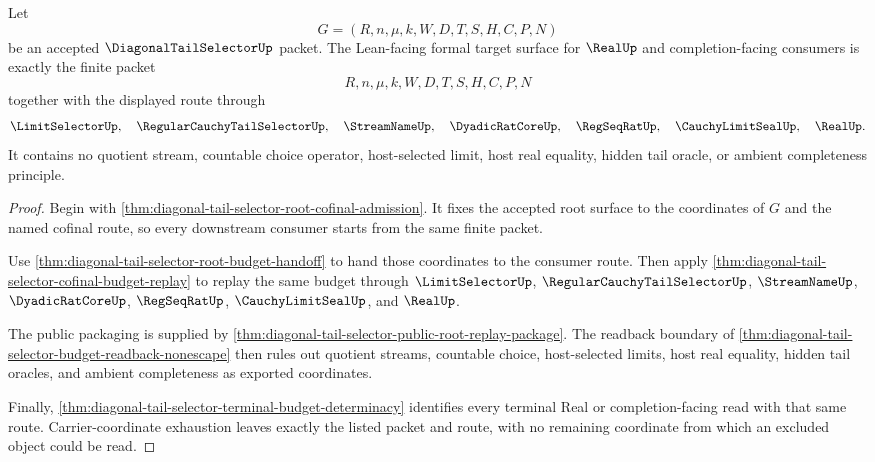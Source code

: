 \begin{theorem}
\label{thm:diagonal-tail-selector-root-formal-target-surface}
Let
$$
G=(R,n,\mu,k,W,D,T,S,H,C,P,N)
$$
be an accepted $\DiagonalTailSelectorUp$ packet. The Lean-facing formal target
surface for $\RealUp$ and completion-facing consumers is exactly the finite
packet
$$
R,n,\mu,k,W,D,T,S,H,C,P,N
$$
together with the displayed route through
$$
\LimitSelectorUp,\quad
\RegularCauchyTailSelectorUp,\quad
\StreamNameUp,\quad
\DyadicRatCoreUp,\quad
\RegSeqRatUp,\quad
\CauchyLimitSealUp,\quad
\RealUp.
$$
It contains no quotient stream, countable choice operator, host-selected
limit, host real equality, hidden tail oracle, or ambient completeness
principle.
\end{theorem}
\begin{proof}
Begin with
\autoref{thm:diagonal-tail-selector-root-cofinal-admission}. It fixes the
accepted root surface to the coordinates of $G$ and the named cofinal route,
so every downstream consumer starts from the same finite packet.

Use \autoref{thm:diagonal-tail-selector-root-budget-handoff} to hand those
coordinates to the consumer route. Then apply
\autoref{thm:diagonal-tail-selector-cofinal-budget-replay} to replay the same
budget through $\LimitSelectorUp$, $\RegularCauchyTailSelectorUp$,
$\StreamNameUp$, $\DyadicRatCoreUp$, $\RegSeqRatUp$,
$\CauchyLimitSealUp$, and $\RealUp$.

The public packaging is supplied by
\autoref{thm:diagonal-tail-selector-public-root-replay-package}. The
readback boundary of
\autoref{thm:diagonal-tail-selector-budget-readback-nonescape} then rules out
quotient streams, countable choice, host-selected limits, host real equality,
hidden tail oracles, and ambient completeness as exported coordinates.

Finally, \autoref{thm:diagonal-tail-selector-terminal-budget-determinacy}
identifies every terminal Real or completion-facing read with that same
route. Carrier-coordinate exhaustion leaves exactly the listed packet and
route, with no remaining coordinate from which an excluded object could be
read.
\end{proof}

